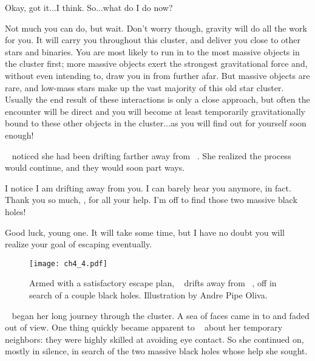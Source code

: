 \documentclass[main.tex]{subfiles}
\begin{document}
\par \Sterope Okay, got it...I think.  So...what do I do now?

\par \Enrico Not much you can do, but wait.  Don't worry though, gravity will do all the work for you.  It will carry you throughout this cluster, and deliver you close to other stars and binaries.  You are most likely to run in to the most massive objects in the cluster first; more massive objects exert the strongest gravitational force and, without even intending to, draw you in from further afar.  But massive objects are rare, and low-mass stars make up the vast majority of this old star cluster.  Usually the end result of these interactions is only a close approach, but often the encounter will be direct and you will become at least temporarily gravitationally bound to these other objects in the cluster...as you will find out for yourself soon enough!  

\par \nar \rmsterope~ noticed she had been drifting farther away from \rmenrico~.  She realized the process would continue, and they would soon part ways.

\par \Sterope I notice I am drifting away from you.  I can barely hear you anymore, in fact.  Thank you so much, \rmenrico, for all your help.  I'm off to find those two massive black holes!

\par \Enrico Good luck, young one.  It will take some time, but I have no doubt you will realize your goal of escaping eventually.

\begin{figure}
\texttt{[image: ch4\_4.pdf]}
\caption{Armed with a satisfactory escape plan, \rmsterope~ drifts away from \rmenrico~, off in search of a couple black holes.  Illustration by Andre Pipe Oliva.
\label{fig:fig1}}
\end{figure}

\par \nar \rmsterope~ began her long journey through the cluster.  A sea of faces came in to and faded out of view.  One thing quickly became apparent to \rmsterope~ about her temporary neighbors:  they were highly skilled at avoiding eye contact.  So she continued on, mostly in silence, in search of the two massive black holes whose help she sought.
\end{document}

